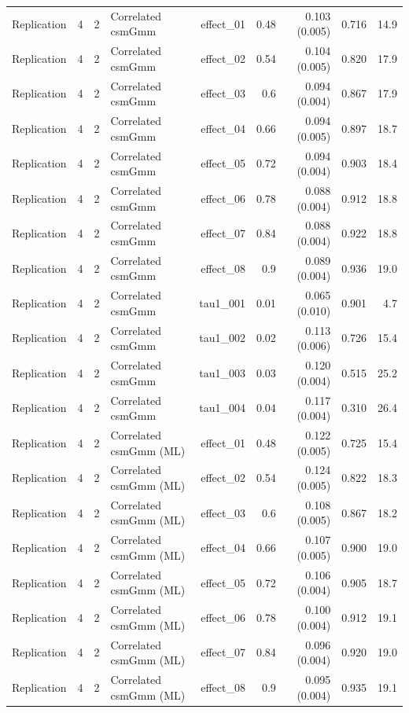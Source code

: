 \begin{longtable}{lcclrrrrr}
Replication & 4 & 2 & Correlated csmGmm & effect\_01 & 0.48 & 0.103 (0.005) & 0.716 & 14.9\\
Replication & 4 & 2 & Correlated csmGmm & effect\_02 & 0.54 & 0.104 (0.005) & 0.820 & 17.9\\
Replication & 4 & 2 & Correlated csmGmm & effect\_03 & 0.6 & 0.094 (0.004) & 0.867 & 17.9\\
Replication & 4 & 2 & Correlated csmGmm & effect\_04 & 0.66 & 0.094 (0.005) & 0.897 & 18.7\\
Replication & 4 & 2 & Correlated csmGmm & effect\_05 & 0.72 & 0.094 (0.004) & 0.903 & 18.4\\
Replication & 4 & 2 & Correlated csmGmm & effect\_06 & 0.78 & 0.088 (0.004) & 0.912 & 18.8\\
Replication & 4 & 2 & Correlated csmGmm & effect\_07 & 0.84 & 0.088 (0.004) & 0.922 & 18.8\\
Replication & 4 & 2 & Correlated csmGmm & effect\_08 & 0.9 & 0.089 (0.004) & 0.936 & 19.0\\
Replication & 4 & 2 & Correlated csmGmm & tau1\_001 & 0.01 & 0.065 (0.010) & 0.901 & 4.7\\
Replication & 4 & 2 & Correlated csmGmm & tau1\_002 & 0.02 & 0.113 (0.006) & 0.726 & 15.4\\
Replication & 4 & 2 & Correlated csmGmm & tau1\_003 & 0.03 & 0.120 (0.004) & 0.515 & 25.2\\
Replication & 4 & 2 & Correlated csmGmm & tau1\_004 & 0.04 & 0.117 (0.004) & 0.310 & 26.4\\
Replication & 4 & 2 & Correlated csmGmm (ML) & effect\_01 & 0.48 & 0.122 (0.005) & 0.725 & 15.4\\
Replication & 4 & 2 & Correlated csmGmm (ML) & effect\_02 & 0.54 & 0.124 (0.005) & 0.822 & 18.3\\
Replication & 4 & 2 & Correlated csmGmm (ML) & effect\_03 & 0.6 & 0.108 (0.005) & 0.867 & 18.2\\
Replication & 4 & 2 & Correlated csmGmm (ML) & effect\_04 & 0.66 & 0.107 (0.005) & 0.900 & 19.0\\
Replication & 4 & 2 & Correlated csmGmm (ML) & effect\_05 & 0.72 & 0.106 (0.004) & 0.905 & 18.7\\
Replication & 4 & 2 & Correlated csmGmm (ML) & effect\_06 & 0.78 & 0.100 (0.004) & 0.912 & 19.1\\
Replication & 4 & 2 & Correlated csmGmm (ML) & effect\_07 & 0.84 & 0.096 (0.004) & 0.920 & 19.0\\
Replication & 4 & 2 & Correlated csmGmm (ML) & effect\_08 & 0.9 & 0.095 (0.004) & 0.935 & 19.1\\

\end{longtable}
